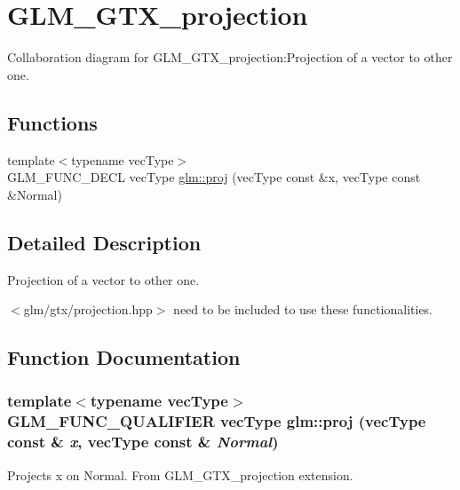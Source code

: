 \hypertarget{group__gtx__projection}{
\section{GLM\_\-GTX\_\-projection}
\label{group__gtx__projection}
}


Collaboration diagram for GLM\_\-GTX\_\-projection:Projection of a vector to other one.  
\subsection*{Functions}
\begin{CompactItemize}
\item 
{\footnotesize template$<$typename vecType$>$ }\\GLM\_\-FUNC\_\-DECL vecType \hyperlink{group__gtx__projection_g2a2ab28abbc6fa33c226ea8dd9ccd8cd}{glm::proj} (vecType const \&x, vecType const \&Normal)
\end{CompactItemize}


\subsection{Detailed Description}
Projection of a vector to other one. 

$<$glm/gtx/projection.hpp$>$ need to be included to use these functionalities. 

\subsection{Function Documentation}
\hypertarget{group__gtx__projection_g2a2ab28abbc6fa33c226ea8dd9ccd8cd}{
\subsubsection[proj]{\setlength{\rightskip}{0pt plus 5cm}template$<$typename vecType$>$ GLM\_\-FUNC\_\-QUALIFIER vecType glm::proj (vecType const \& {\em x}, \/  vecType const \& {\em Normal})}}
\label{group__gtx__projection_g2a2ab28abbc6fa33c226ea8dd9ccd8cd}


Projects x on Normal. From GLM\_\-GTX\_\-projection extension. 